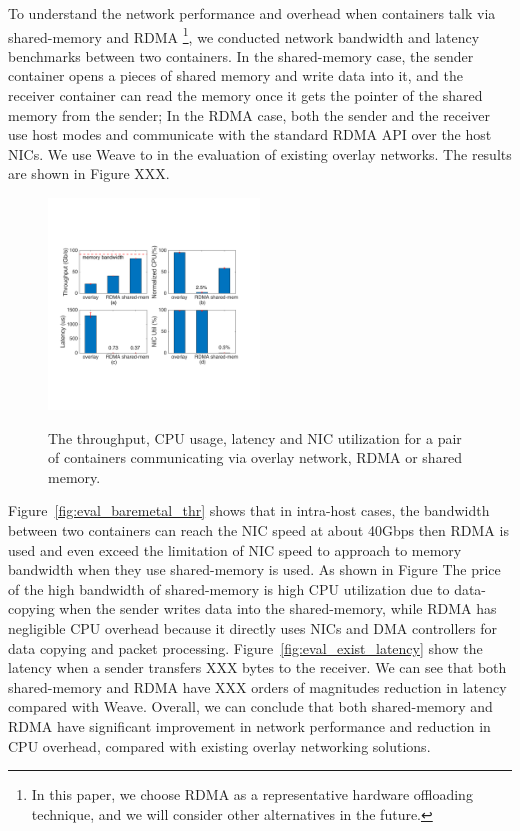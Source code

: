 To understand the network performance and overhead when containers talk via
shared-memory and RDMA \footnote{In this paper, we choose RDMA as a
representative hardware offloading technique, and we will consider other
alternatives in the future.}, we conducted network bandwidth and latency
benchmarks between two containers. In the shared-memory case, the sender
container opens a pieces of shared memory and write data into it, and the
receiver container can read the memory once it gets the pointer of the shared
memory from the sender; In the RDMA case, both the sender and the receiver use
host modes and communicate with the standard RDMA API over the host NICs. We use
Weave to in the evaluation of existing overlay networks. The results are shown
in Figure XXX.

     \begin{figure}[ht]
     \centering 
     \includegraphics[width=0.5\textwidth]{figures/motivation/mot_rdma_shm.pdf}      
     \label{fig:mot_rdma_shm}
     \caption{The throughput, CPU usage, latency and NIC utilization for a pair of 
     containers communicating via overlay network, RDMA or shared memory.} 
     \end{figure}

Figure~\ref{fig:eval_baremetal_thr} shows that in intra-host cases, the bandwidth between two
containers can reach the NIC speed at about 40Gbps then RDMA is used and 
even exceed the limitation of NIC speed to approach to memory bandwidth when
they use shared-memory is used. As shown in Figure The price of the high bandwidth of shared-memory is high CPU utilization due to data-copying when the sender writes data into
the shared-memory, while RDMA has negligible CPU overhead because it directly uses NICs and DMA controllers for data copying and packet processing.
Figure~\ref{fig:eval_exist_latency} show the latency when a sender 
transfers XXX bytes to the receiver. We can see that both shared-memory
and RDMA have XXX orders of magnitudes reduction in latency compared with Weave.
Overall, we can conclude that both shared-memory and RDMA have 
significant improvement in network performance and reduction in CPU overhead,
compared with existing overlay networking solutions.

